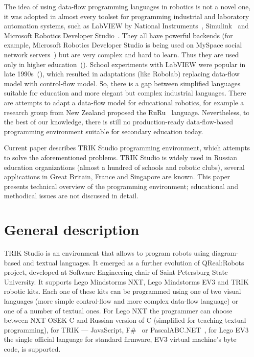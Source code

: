 \documentclass[conference]{IEEEtran}
\begin{document}
The idea of using data-flow programming languages in robotics is not a novel one, it was adopted in almost every toolset for programming industrial and laboratory automation systems, such as LabVIEW by National Instruments~\cite{kodosky1991visual}, Simulink~\cite{dabney2004mastering} and Microsoft Robotics Developer Studio~\cite{jackson2007microsoft}. They all have powerful backends (for example, Microsoft Robotics Developer Studio is being used on MySpace social network servers~\cite{scherotter2009ccr}) but are very complex and hard to learn. Thus they are used only in higher education~(\cite{stefanovic2011labview,yi2005labview}). School experiments with LabVIEW were popular in late 1990s~(\cite{cyr1997low,portsmore1999robolab}), which resulted in adaptations (like Robolab) replacing data-flow model  with control-flow model. So, there is a gap between simplified languages suitable for education and more elegant but complex industrial languages. There are attempts to adapt a data-flow model for educational robotics, for example a research group from New Zealand proposed the RuRu~\cite{diprose2011ruru} language. Nevertheless, to the best of our knowledge, there is still no production-ready data-flow-based programming environment suitable for secondary education today.

Current paper describes TRIK Studio programming environment, which attempts to solve the aforementioned problems. TRIK Studio is widely used in Russian education organizations (almost a hundred of schools and robotic clubs), several applications in Great Britain, France and Singapore are known. This paper presents technical overview of the programming environment; educational and methodical issues are not discussed in detail.

\section{General description}
\label{chapter:generalDescription}

TRIK Studio is an environment that allows to program robots using diagram-based and textual languages. It emerged as a further evolution of QReal:Robots~\cite{terekhov2013robots} project, developed at Software Engineering chair of Saint-Petersburg State University. It supports Lego Mindstorms NXT, Lego Mindstorms EV3 and TRIK robotic kits. Each one of these kits can be programmed using one of two visual languages (more simple control-flow and more complex data-flow language) or one of a number of textual ones. For Lego NXT the programmer can choose between NXT OSEK C and Russian version of C (simplified for teaching textual programming), for TRIK --- JavaScript, F\#~\cite{kirsanov2014robotics} or PascalABC.NET~\cite{doliner2014basics}, for Lego EV3 the single official language for standard firmware, EV3 virtual machine's byte code, is supported.
\end{document}
